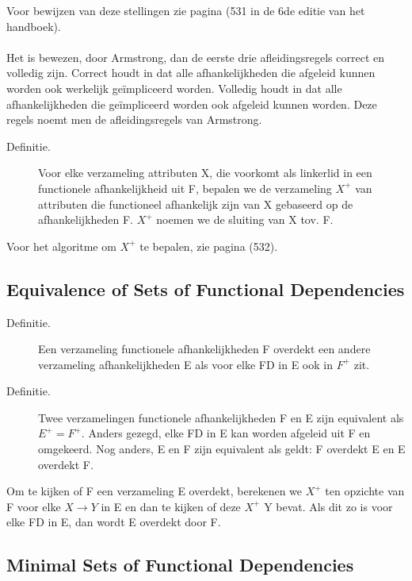 			Voor bewijzen van deze stellingen zie pagina (531 in de 6de editie van het handboek).
			
			\paragraph*{}
			Het is bewezen, door Armstrong, dan de eerste drie afleidingsregels correct en volledig zijn. Correct houdt in dat alle afhankelijkheden die afgeleid kunnen worden ook werkelijk 				ge\"impliceerd worden. Volledig houdt in dat alle afhankelijkheden die ge\"impliceerd worden ook afgeleid kunnen worden. Deze regels noemt men de afleidingsregels van Armstrong.
			
			\begin{description}
				\item[Definitie. ] Voor elke verzameling attributen X, die voorkomt als linkerlid in een functionele afhankelijkheid uit F, bepalen we de verzameling $X^+$ van attributen 						die	functioneel afhankelijk zijn van X gebaseerd op de afhankelijkheden F. $X^+$ noemen we de sluiting van X tov. F.
			\end{description}
			
			Voor het algoritme om $X^+$ te bepalen, zie pagina (532).
			
			
		\subsection{Equivalence of Sets of Functional Dependencies}
			
			\begin{description}
				\item[Definitie. ] Een verzameling functionele afhankelijkheden F overdekt een andere verzameling afhankelijkheden E als voor elke FD in E ook in $F^+$ zit. 
				\item[Definitie. ] Twee verzamelingen functionele afhankelijkheden F en E zijn equivalent als $E^+ = F^+$. Anders gezegd, elke FD in E kan worden afgeleid uit F en 							omgekeerd. Nog anders, E en F zijn equivalent als geldt: F overdekt E en E overdekt F.
			\end{description}
			
			Om te kijken of F een verzameling E overdekt, berekenen we $X^+$ ten opzichte van F voor elke $X \rightarrow Y$ in E en dan te kijken of deze $X^+$ Y bevat. Als dit zo is voor 				elke FD in E, dan wordt E overdekt door F.
			
		\subsection{Minimal Sets of Functional Dependencies}
		
